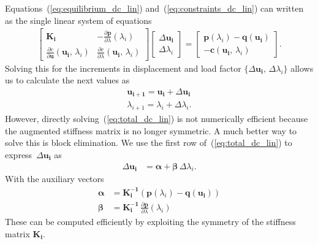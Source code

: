 Equations~(\ref{eq:equilibrium_dc_lin}) and~(\ref{eq:constraints_dc_lin}) can written as the single linear system of equations
%
\begin{align}
\begin{bmatrix}
\boldsymbol{K_{i}} & -\frac{\partial \boldsymbol{p}}{\partial \lambda}(\lambda_i)\\
\frac{\partial c}{\partial \boldsymbol{u}}(\boldsymbol{u_{i}},\,\lambda_{i}) & \frac{\partial c}{\partial \lambda}(\boldsymbol{u_{i}},\,\lambda_{i})
\end{bmatrix}
\begin{bmatrix}
\Delta\boldsymbol{u_{i}}\\
\Delta \lambda_{i}
\end{bmatrix}
=
\begin{bmatrix}
\boldsymbol{p}(\lambda_i) - \boldsymbol{q}(\boldsymbol{u_{i}})\\
-\boldsymbol{c}(\boldsymbol{u_{i}},\,\lambda_{i})
\end{bmatrix}.\label{eq:total_dc_lin}
\end{align}
%
Solving this for the increments in displacement and load factor $\{\Delta\boldsymbol{u_{i}},\,\Delta \lambda_{i}\}$ allows us to calculate the next values as
%
\begin{align}
\boldsymbol{u_{i+1}} = \boldsymbol{u_{i}} + \Delta\boldsymbol{u_{i}}\\
\lambda_{i+1} = \lambda_{i} + \Delta \lambda_{i}.
\end{align}
%
However, directly solving~(\ref{eq:total_dc_lin}) is not  numerically efficient because the augmented stiffness matrix is no longer symmetric. A much better way to solve this is block elimination. We use the first row of~(\ref{eq:total_dc_lin}) to express~$\Delta\boldsymbol{u_{i}}$ as
%
\begin{align}
\Delta\boldsymbol{u_{i}} &= \boldsymbol{\alpha} + \boldsymbol{\beta}\,\Delta \lambda_{i}.\label{eq:auxiliary_disp_dc}
\end{align}
%
With the auxiliary vectors
%
\begin{align}
\boldsymbol{\alpha} &= \boldsymbol{K_{i}^{-1}}(\boldsymbol{p}(\lambda_i) - \boldsymbol{q}(\boldsymbol{u_{i}}))\label{eq:auxiliary_1}\\
\boldsymbol{\beta} &= \boldsymbol{K_{i}^{-1}}\,\frac{\partial \boldsymbol{p}}{\partial \lambda}(\lambda_i)\label{eq:auxiliary_2}
\end{align}
%
These can be computed efficiently by exploiting the symmetry of the stiffness matrix $\boldsymbol{K_{i}}$.
%
